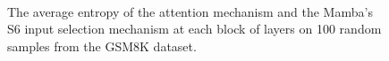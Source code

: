\documentclass{article}
\begin{document}
\begin{figure}[h]
\vspace{-0.4cm}
    \centering
    \\
    \caption{The average entropy of the attention mechanism and the Mamba's S6 input selection mechanism at each block of layers on 100 random samples from the GSM8K dataset.}
    \label{fig:ent}
    \vspace{-0.4cm}
\end{figure}



\end{document}
